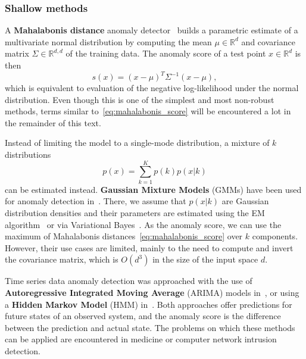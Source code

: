 \subsubsection{Shallow methods}
A \textbf{Mahalabonis distance} anomaly detector~\cite{laurikkala2000informal} builds a parametric estimate of a multivariate normal distribution by computing the mean $\mu \in \mathbb{R}^d$ and covariance matrix $\Sigma \in \mathbb{R}^{d,d}$ of the training data. The anomaly score of a test point $x \in \mathbb{R}^d$ is then
\begin{equation} \label{eq:mahalabonis_score}
	s(x) =  (x - \mu) ^T \Sigma ^{-1} (x-\mu),
\end{equation}
which is equivalent to evaluation of the negative log-likelihood under the normal distribution. Even though this is one of the simplest and most non-robust methods, terms similar to~\eqref{eq:mahalabonis_score} will be encountered a lot in the remainder of this text.

Instead of limiting the model to a single-mode distribution, a mixture of $k$ distributions 
\begin{equation} \label{eq:mixture}
	p(x) = \sum_{k=1}^K p(k) p(x|k)
\end{equation}
can be estimated instead. \textbf{Gaussian Mixture Models} (GMMs) have been used for anomaly detection in~\cite{roberts1994probabilistic,mahadevan2010anomaly}. There, we assume that $p(x|k)$ are Gaussian distribution densities and their parameters are estimated using the EM algorithm~\cite{dempster1977maximum} or via Variational Bayes~\cite{bishop2006pattern}. As the anomaly score, we can use the maximum of Mahalabonis distances~\eqref{eq:mahalabonis_score} over $k$ components. However, their use cases are limited, mainly to the need to compute and invert the covariance matrix, which is $O(d^3)$ in the size of the input space $d$.

Time series data anomaly detection was approached with the use of \textbf{Autoregressive Integrated Moving Average} (ARIMA) models in~\cite{roberts1994probabilistic,hoare2002line}, or using a \textbf{Hidden Markov Model} (HMM) in~\cite{yeung2003host,zhang2003new}. Both approaches offer predictions for future states of an observed system, and  the anomaly score is the difference between the prediction and actual state. The problems on which these methods can be applied are encountered in medicine or computer network intrusion detection.

